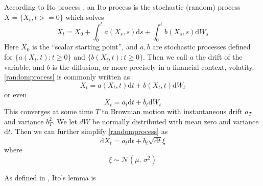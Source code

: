 \documentclass[11pt]{article} %
\begin{document}
According to Ito process \cite{itoprocess}, an Ito process is the stochastic (random) 
process $X = \{X_t, t>=0\}$ which solves 
\begin{equation} \label{randomprocess}
X_t = X_0 + \int_{0}^{t} a(X_s, s)\mathrm{d}s + 
\int_{0}^{t} b(X_s, s) \mathrm{d}W_s
\end{equation}
Here $X_0$ is the ``scalar starting point'', and $a,b$ are stochastic 
processes defined for $\{a(X_t, t) : t\geq0\} $ and $\{b(X_t, t) : t\geq0\}$. 
Then we call $a$ the drift of the variable, and $b$ is the diffusion, 
or more precisely in a financial context, volatity. \eqref{randomprocess} is commonly 
written as 
\begin{equation}
    X_t = a(X_t, t)\mathrm{d}t + b(X_t, t)\mathrm{d}W_t
\end{equation}
or even 
\begin{equation} \label{itoprocess}
    X_t = a_t\mathrm{d}t + b_t\mathrm{d}W_t
\end{equation}
This converges at some time $T$ to Brownian motion with instantaneous drift $a_T$ and
variance $b_T^2$. We let $dW$ be normally distributed with mean zero and variance 
$\mathrm{d}t$. Then we can further simplify \eqref{randomprocess} as 
\begin{equation}
    \mathrm{d}X_t = a_t\mathrm{d}t + b_t \sqrt{\mathrm{d}t}\xi
\end{equation}
where
\begin{equation}
    \xi \sim \mathcal{N}(\mu,\,\sigma^{2})
\end{equation}

As defined in \cite{itoprocess}, Ito's lemma is 
\end{document}
